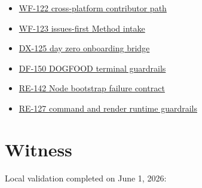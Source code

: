 \begin{itemize}
\tightlist
\item
  \href{https://github.com/flyingrobots/bijou/blob/cbd70612140e7a450d764b3c7be1c6af878b99bc/docs/design/WF-122-cross-platform-contributor-path.md}{WF-122 cross-platform contributor path}
\item
  \href{https://github.com/flyingrobots/bijou/blob/cbd70612140e7a450d764b3c7be1c6af878b99bc/docs/design/WF-123-issues-first-method-intake.md}{WF-123 issues-first Method intake}
\item
  \href{https://github.com/flyingrobots/bijou/blob/cbd70612140e7a450d764b3c7be1c6af878b99bc/docs/design/DX-125-day-zero-onboarding-bridge.md}{DX-125 day zero onboarding bridge}
\item
  \href{https://github.com/flyingrobots/bijou/blob/cbd70612140e7a450d764b3c7be1c6af878b99bc/docs/design/DF-150-dogfood-terminal-guardrails.md}{DF-150 DOGFOOD terminal guardrails}
\item
  \href{https://github.com/flyingrobots/bijou/blob/cbd70612140e7a450d764b3c7be1c6af878b99bc/docs/design/RE-142-node-bootstrap-failure-contract.md}{RE-142 Node bootstrap failure contract}
\item
  \href{https://github.com/flyingrobots/bijou/blob/cbd70612140e7a450d764b3c7be1c6af878b99bc/docs/design/RE-127-command-and-render-runtime-guardrails.md}{RE-127 command and render runtime guardrails}
\end{itemize}

\section{Witness}\label{record-407-witness}

Local validation completed on June 1, 2026:


